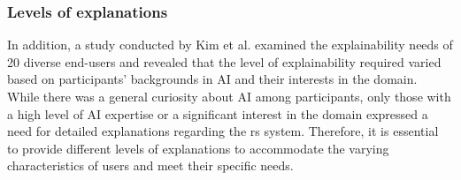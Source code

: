 \subsubsection{Levels of explanations}

In addition, a study conducted by Kim et al. \cite{Kim2023} examined the explainability needs of 20 diverse end-users 
and revealed that the level of explainability required varied based on participants' backgrounds in AI and their interests in the domain. 
While there was a general curiosity about AI among participants, only those with a high level of AI expertise or a significant interest in the domain expressed a need for detailed explanations regarding the \gls{rs} system. 
Therefore, it is essential to provide different levels of explanations to accommodate the varying characteristics of users and meet their specific needs. 

